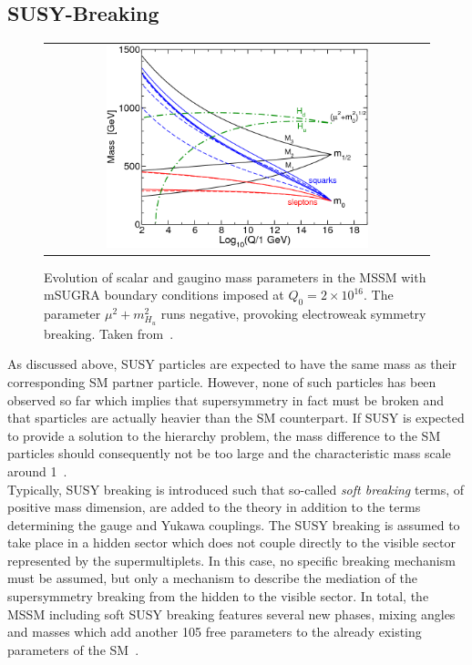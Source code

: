 \subsection{SUSY-Breaking}
\label{subsec:susy_breaking}
\begin{figure}[!tp]
  \centering 
  \begin{tabular}{c}
    \includegraphics[width=0.7\textwidth]{figures/MSSMrun.png}
  \end{tabular}
  \caption{Evolution of scalar and gaugino mass parameters in the MSSM with mSUGRA boundary conditions imposed at $Q_0 = 2 \times 10^{16}$\gev. The parameter $\mu^2 + m^2_{H_{u}}$ runs negative, provoking electroweak symmetry breaking. Taken from~\cite{Martin:1997ns}.}
  \label{fig:MSSMrun}
\end{figure}
As discussed above, SUSY particles are expected to have the same mass as their corresponding SM partner particle. However, none of such particles has been observed so far which implies that supersymmetry in fact must be broken and that sparticles are actually heavier than the SM counterpart. If SUSY is expected to provide a solution to the hierarchy problem, the mass difference to the SM particles should consequently not be too large and the characteristic mass scale around 1\tev~\cite{Martin:1997ns}. \\
Typically, SUSY breaking is introduced such that so-called \textit{soft breaking} terms, \ie of positive mass dimension, are added to the theory in addition to the terms determining the gauge and Yukawa couplings. The SUSY breaking is assumed to take place in a hidden sector which does not couple directly to the visible sector represented by the supermultiplets. In this case, no specific breaking mechanism must be assumed, but only a mechanism to describe the mediation of the supersymmetry breaking from the hidden to the visible sector. In total, the MSSM including soft SUSY breaking features several new phases, mixing angles and masses which add another 105 free parameters to the already existing parameters of the SM~\cite{Dimopoulos:1995ju}.  \\

